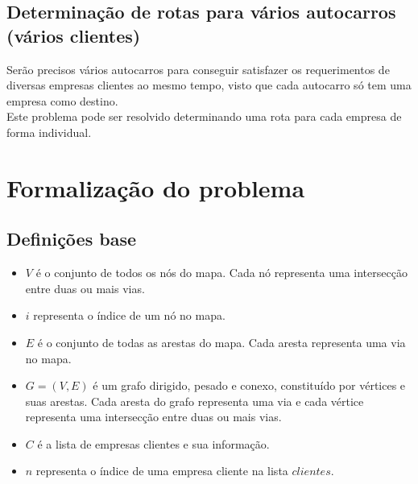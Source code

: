 \documentclass{report}
\begin{document}
  \section{Determinação de rotas para vários autocarros (vários clientes)}
    Serão precisos vários autocarros para conseguir satisfazer os requerimentos
    de diversas empresas clientes ao mesmo tempo, visto que cada autocarro só
    tem uma empresa como destino.\\
    Este problema pode ser resolvido determinando uma rota para cada empresa
    de forma individual.

\newcommand{\arrou}[2] {$\hbox{#1} \rightarrow \hbox{#2}$}
\newcommand{\arrouline}[2] {$\hbox{\underline{#1}} \rightarrow \hbox{#2}$}

\chapter{Formalização do problema}
  \section{Definições base}
    \begin{itemize}
      \item $V$ é o conjunto de todos os nós do mapa. Cada nó representa uma
        intersecção entre duas ou mais vias.
      \item $i$ representa o índice de um nó no mapa.

      \item $E$ é o conjunto de todas as arestas do mapa. Cada aresta representa
        uma via no mapa.

      \item $G = (V, E)$ é um grafo dirigido, pesado e conexo, constituído por
        vértices e suas arestas. Cada aresta do grafo representa uma via e cada
        vértice representa uma intersecção entre duas ou mais vias.

      \item $C$ é a lista de empresas clientes e sua informação.
      \item $n$ representa o índice de uma empresa cliente na lista $clientes$.
    \end{itemize}
\end{document}
